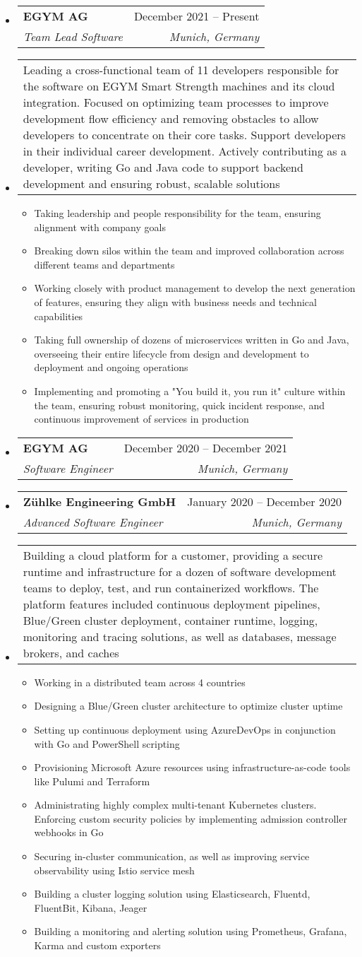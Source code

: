 \documentclass[letterpaper,12pt]{article}
\makeatletter
\newcommand{\resumeEntryStart}{\vspace{0.5\baselineskip}\begin{minipage}{\textwidth}\begin{itemize}[leftmargin=2.5mm]}
\newcommand{\resumeEntryEnd}{\end{itemize}\end{minipage}\vspace{1\baselineskip}}
\newcommand{\resumeItemListStart}{\begin{itemize}[leftmargin=4.5mm]}
\newcommand{\resumeItemListEnd}{\end{itemize}}
\newcommand{\resumeItem}[1]{
  \item\small{
    {#1 \vspace{-2pt}}
  }
}
\newcommand{\resumeEntryTSDL}[4]{
  \vspace{-1pt}\item[]
    \begin{tabularx}{0.97\textwidth}{X@{\hspace{60pt}}r}
      \textbf{\color{primary}#1} & {\color{accent}\small#2} \\
      \textit{\color{accent}\small#3} & \textit{\color{accent}\small#4} \\
    \end{tabularx}\vspace{-6pt}
}
\newcommand{\resumeEntryDesc}[1]{
  \vspace{-1pt}\item[] 
  \small{
    \begin{tabularx}{0.97\textwidth}{X}
      #1
    \end{tabularx}
  }
  \vspace{-6pt}
}
\makeatother
\begin{document}
  \resumeEntryStart
    \resumeEntryTSDL
      {EGYM AG}{December 2021 -- Present}
      {Team Lead Software}{Munich, Germany}
    \resumeEntryDesc{Leading a cross-functional team of 11 developers responsible for the software on EGYM Smart Strength machines and its cloud integration. Focused on optimizing team processes to improve development flow efficiency and removing obstacles to allow developers to concentrate on their core tasks. Support developers in their individual career development. Actively contributing as a developer, writing Go and Java code to support backend development and ensuring robust, scalable solutions}
    \resumeItemListStart
    \resumeItem {Taking leadership and people responsibility for the team, ensuring alignment with company goals}
    \resumeItem {Breaking down silos within the team and improved collaboration across different teams and departments}
    \resumeItem {Working closely with product management to develop the next generation of features, ensuring they align with business needs and technical capabilities}
    \resumeItem {Taking full ownership of dozens of microservices written in Go and Java, overseeing their entire lifecycle from design and development to deployment and ongoing operations}
    \resumeItem {Implementing and promoting a "You build it, you run it" culture within the team, ensuring robust monitoring, quick incident response, and continuous improvement of services in production}
    \resumeItemListEnd
  \resumeEntryEnd

  \resumeEntryStart
    \resumeEntryTSDL
      {EGYM AG}{December 2020 -- December 2021}
      {Software Engineer}{Munich, Germany}
  \resumeEntryEnd

  \resumeEntryStart
    \resumeEntryTSDL
      {Zühlke Engineering GmbH}{January 2020 -- December 2020}
      {Advanced Software Engineer}{Munich, Germany}
    \resumeEntryDesc{Building a cloud platform for a customer, providing a secure runtime and infrastructure for a dozen of software development teams to deploy, test, and run containerized workflows. The platform features included continuous deployment pipelines, Blue/Green cluster deployment, container runtime, logging, monitoring and tracing solutions, as well as databases, message brokers, and caches}
    \resumeItemListStart
        \resumeItem {Working in a distributed team across 4 countries}
        \resumeItem {Designing a Blue/Green cluster architecture to optimize cluster uptime}
        \resumeItem {Setting up continuous deployment using AzureDevOps in conjunction with Go and PowerShell scripting}
        \resumeItem {Provisioning Microsoft Azure resources using infrastructure-as-code tools like Pulumi and Terraform}
        \resumeItem {Administrating highly complex multi-tenant Kubernetes clusters. Enforcing custom security policies by implementing admission controller webhooks in Go}
        \resumeItem {Securing in-cluster communication, as well as improving service observability using Istio service mesh}
        \resumeItem {Building a cluster logging solution using Elasticsearch, Fluentd, FluentBit, Kibana, Jeager}
        \resumeItem {Building a monitoring and alerting solution using Prometheus, Grafana, Karma and custom exporters}
    \resumeItemListEnd
  \resumeEntryEnd
\end{document}
